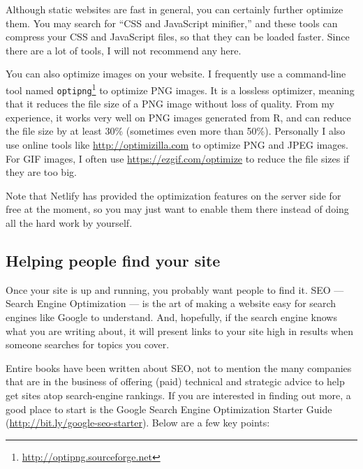 \documentclass[12pt,]{krantz}
\renewcommand{\href}[2]{#2\footnote{\url{#1}}}
\theoremstyle{definition}
\theoremstyle{definition}
\theoremstyle{definition}
\theoremstyle{remark}
\begin{document}
Although static websites are fast in general, you
can certainly further optimize them. You may search for ``CSS and
JavaScript minifier,'' and these tools can compress your CSS and
JavaScript files, so that they can be loaded faster. Since there are a
lot of tools, I will not recommend any here.

You can also optimize images on your website. I frequently use a
command-line tool named
\href{http://optipng.sourceforge.net}{\texttt{optipng}} to optimize PNG
images. It is a lossless optimizer, meaning that it reduces the file
size of a PNG image without loss of quality. From my experience, it
works very well on PNG images generated from R, and can reduce the file
size by at least 30\% (sometimes even more than 50\%). Personally I also
use online tools like \url{http://optimizilla.com} to optimize PNG and
JPEG images. For GIF images, I often use
\url{https://ezgif.com/optimize} to reduce the file sizes if they are
too big.

Note that Netlify has provided the optimization features on the server
side for free at the moment, so you may just want to enable them there
instead of doing all the hard work by yourself.

\hypertarget{helping-people-find-your-site}{%
\subsection{Helping people find your
site}\label{helping-people-find-your-site}}

Once your site is up and running, you probably want people to find it.
SEO --- Search Engine Optimization --- is the art of making a website
easy for search engines like Google to understand. And, hopefully, if
the search engine knows what you are writing about, it will present
links to your site high in results when someone searches for topics you
cover.

Entire books have been written about SEO, not to mention the many
companies that are in the business of offering (paid) technical and
strategic advice to help get sites atop search-engine rankings. If you
are interested in finding out more, a good place to start is the Google
Search Engine Optimization Starter Guide
(\url{http://bit.ly/google-seo-starter}). Below are a few key points:
\end{document}

